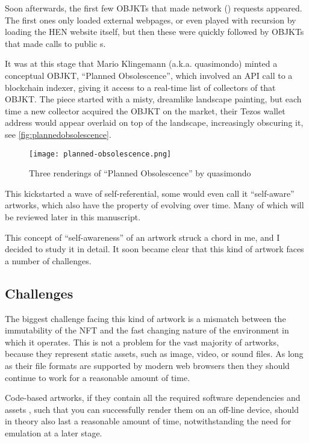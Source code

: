 Soon afterwards, the first few OBJKTs that made network () requests appeared. The first ones only loaded external webpages, or even played with recursion by loading the HEN website itself, but then these were quickly followed by OBJKTs that made calls to public s.

It was at this stage that Mario Klingemann (a.k.a. quasimondo) minted a conceptual OBJKT, ``Planned Obsolescence'', which involved an API call to a blockchain indexer, giving it access to a real-time list of collectors of that OBJKT. The piece started with a misty, dreamlike landscape painting, but each time a new collector acquired the OBJKT on the market, their Tezos wallet address would appear overlaid on top of the landscape, increasingly obscuring it, see \autoref{fig:plannedobsolescence}.


\begin{figure}[H]
    \centering
    \texttt{[image: planned-obsolescence.png]}
    \caption[``Planned Obsolescence'' by quasimondo]{Three renderings of ``Planned Obsolescence'' by quasimondo}
    \label{fig:plannedobsolescence}
\end{figure}


This kickstarted a wave of self-referential, some would even call it ``self-aware'' artworks, which also have the property of evolving over time. Many of which will be reviewed later in this manuscript.

This concept of ``self-awareness'' of an artwork struck a chord in me, and I decided to study it in detail. It soon became clear that this kind of artwork faces a number of challenges. 

\subsection{Challenges}

The biggest challenge facing this kind of artwork is a mismatch between the immutability of the NFT and the fast changing nature of the environment in which it operates. This is not a problem for the vast majority of artworks, because they represent static assets, such as image, video, or sound files. As long as their file formats are supported by modern web browsers then they should continue to work for a reasonable amount of time.

Code-based artworks, if they contain all the required software dependencies and assets , such that you can successfully render them on an off-line device, should in theory also last a reasonable amount of time, notwithstanding the need for emulation at a later stage.

